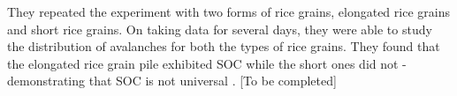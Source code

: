 \documentclass{book}
\begin{document}
They repeated the experiment with two forms of rice grains, elongated rice grains and short rice grains. On taking data for several days, they were able to study the distribution of avalanches for both the types of rice grains. They found that the elongated rice grain pile exhibited SOC while the short ones did not - demonstrating that SOC is not universal \cite{riceExpt}. 
[To be completed]
%
%
%


\end{document}
